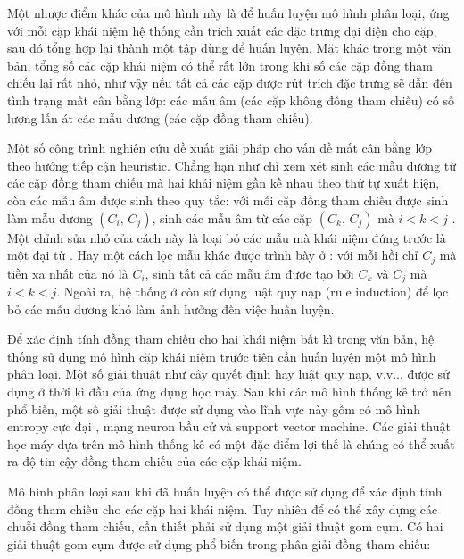 Một nhược điểm khác của mô hình này là để huấn luyện mô hình phân loại, ứng với mỗi cặp khái niệm hệ thống cần trích xuất các đặc trưng đại diện cho cặp, sau đó tổng hợp lại thành một tập dùng để huấn luyện. Mặt khác trong một văn bản, tổng số các cặp khái niệm có thể rất lớn trong khi số các cặp đồng tham chiếu lại rất nhỏ, như vậy nếu tất cả các cặp được rút trích đặc trưng sẽ dẫn đến tình trạng mất cân bằng lớp: các mẫu âm (các cặp không đồng tham chiếu) có số lượng lấn át các mẫu dương (các cặp đồng tham chiếu).

Một số công trình nghiên cứu đề xuất giải pháp cho vấn đề mất cân bằng lớp theo hướng tiếp cận heuristic. Chẳng hạn như chỉ xem xét sinh các mẫu dương từ các cặp đồng tham chiếu mà hai khái niệm gần kề nhau theo thứ tự xuất hiện, còn các mẫu âm được sinh theo quy tắc: với mỗi cặp đồng tham chiếu được sinh làm mẫu dương $(C_i,\,C_j)$, sinh các mẫu âm từ các cặp $(C_k,\,C_j)$ mà $i<k<j$ \cite{Soon2001}. Một chỉnh sửa nhỏ của cách này là loại bỏ các mẫu mà khái niệm đứng trước là một đại từ \cite{VincentNg2002a}. Hay một cách lọc mẫu khác được trình bày ở \cite{VincentNg2002b}: với mỗi hồi chỉ $C_j$ mà tiền xa nhất của nó là $C_i$, sinh tất cả các mẫu âm được tạo bởi $C_k$ và $C_j$ mà $i<k<j$. Ngoài ra, hệ thống ở \cite{VincentNg2002b} còn sử dụng luật quy nạp (rule induction) để lọc bỏ các mẫu dương khó làm ảnh hưởng đến việc huấn luyện.

Để xác định tính đồng tham chiếu cho hai khái niệm bất kì trong văn bản, hệ thống sử dụng mô hình cặp khái niệm trước tiên cần huấn luyện một mô hình phân loại. Một số giải thuật như cây quyết định hay luật quy nạp, v.v... được sử dụng ở thời kì đầu của ứng dụng học máy. Sau khi các mô hình thống kê trở nên phổ biến, một số giải thuật được sử dụng vào lĩnh vực này gồm có mô hình entropy cực đại \cite{Berger1996}, mạng neuron bầu cử \cite{Freund1999} và support vector machine. Các giải thuật học máy dựa trên mô hình thống kê có một đặc điểm lợi thế là chúng có thể xuất ra độ tin cậy đồng tham chiếu của các cặp khái niệm. 

Mô hình phân loại sau khi đã huấn luyện có thể được sử dụng để xác định tính đồng tham chiếu cho các cặp hai khái niệm. Tuy nhiên để có thể xây dựng các chuỗi đồng tham chiếu, cần thiết phải sử dụng một giải thuật gom cụm. Có hai giải thuật gom cụm được sử dụng phổ biến trong phân giải đồng tham chiếu:

